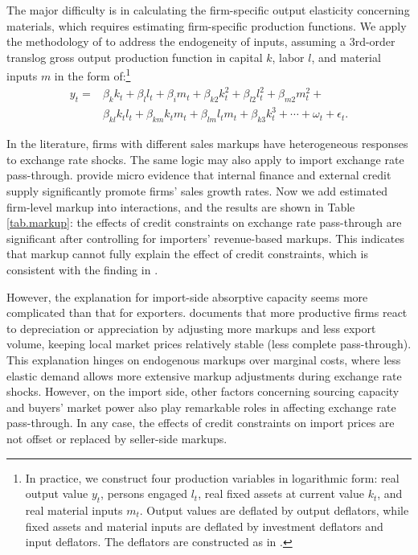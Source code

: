 The major difficulty is in calculating the firm-specific output elasticity concerning materials, which requires estimating firm-specific production functions. We apply the methodology of \cite{acf2015} to address the endogeneity of inputs, assuming a 3rd-order translog gross output production function in capital $k$, labor $l$, and material inputs $m$ in the form of:\footnote{In practice, we construct four production variables in logarithmic form: real output value $y_t$, persons engaged $l_t$, real fixed assets at current value $k_t$, and real material inputs $m_t$. Output values are deflated by output deflators, while fixed assets and material inputs are deflated by investment deflators and input deflators. The deflators are constructed as in \cite{brandt2012}.}
$$
\begin{aligned}
	y_{t}= &\beta_{k} k_{t}+\beta_{l} l_{t}+\beta_{i} m_{t}+\beta_{k 2} k_{t}^{2}+\beta_{l 2} l_{t}^{2}+\beta_{m 2} m_{t}^{2}+ \\ &\beta_{k l} k_{ t} l_{t}+\beta_{k m} k_{t} m_{t}+\beta_{l m} l_{t} m_{t}+\beta_{k 3} k_{t}^{3}+\cdots+\omega_{t}+\epsilon_{t}.
\end{aligned}
$$

In the literature, firms with different sales markups have heterogeneous responses to exchange rate shocks. The same logic may also apply to import exchange rate pass-through. \cite{llz2018} provide micro evidence that internal finance and external credit supply significantly promote firms' sales growth rates. Now we add estimated firm-level markup into interactions, and the results are shown in Table \ref{tab.markup}: the effects of credit constraints on exchange rate pass-through are significant after controlling for importers' revenue-based markups. This indicates that markup cannot fully explain the effect of credit constraints, which is consistent with the finding in \cite{xu-guo2021}.

However, the explanation for import-side absorptive capacity seems more complicated than that for exporters. \cite{bmm2012} documents that more productive firms react to depreciation or appreciation by adjusting more markups and less export volume, keeping local market prices relatively stable (less complete pass-through). This explanation hinges on endogenous markups over marginal costs, where less elastic demand allows more extensive markup adjustments during exchange rate shocks. However, on the import side, other factors concerning sourcing capacity and buyers' market power also play remarkable roles in affecting exchange rate pass-through. In any case, the effects of credit constraints on import prices are not offset or replaced by seller-side markups.

